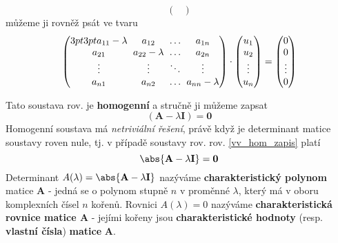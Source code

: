 \begin{definition}
\begin{equation}
\begin{pmatrix}
          \end{pmatrix}
        \end{equation}
        můžeme ji rovněž psát ve tvaru
        \begin{equation*}
            \begin{pmatrix}
            \setlength{\arraycolsep}{3pt}
              a_{11} -\lambda & a_{12}           & \ldots & a_{1n} \\
              a_{21}          & a_{22} -\lambda  & \ldots & a_{2n} \\
              \vdots          & \vdots           & \ddots & \vdots \\
              a_{n1}          & a_{n2}           & \ldots & a_{nn}-\lambda
            \end{pmatrix} \cdot
          \begin{pmatrix}
            u_{1} \\ u_{2} \\ \vdots \\ u_{n} \\
          \end{pmatrix}  =
          \begin{pmatrix}
              0 \\ 0 \\ \vdots \\ 0 \\
            \end{pmatrix}
        \end{equation*}
      \end{definition}

       Tato soustava rov. je \textbf{homogenní} a stručně ji můžeme zapsat
      \begin{equation}\label{vv_hom_zapis}
        \left(\mathbf{A} - \lambda\mathbf{I}\right) = \mathbf{0}
      \end{equation}
      Homogenní soustava má \emph{netriviální řešení}, právě když je determinant matice soustavy 
      roven  nule, tj. v případě soustavy rov. rov. \ref{vv_hom_zapis} platí
      \begin{equation}\label{vv_hom_reseni}
        \abs{\mathbf{A} - \lambda\mathbf{I}} = \mathbf{0}
      \end{equation}
      Determinant \(A(\lambda)=\abs{\mathbf{A} - \lambda \mathbf{I}}\) nazýváme 
      \textbf{charakteristický polynom} matice \(\mathbf{A}\) - jedná se o polynom stupně \(n\) v 
      proměnné \(\lambda\), který má v oboru komplexních čísel \(n\) kořenů. Rovnici 
      \(A(\lambda)=0\) nazýváme \textbf{charakteristická rovnice matice \(\mathbf{A}\)} - jejími 
      kořeny jsou \textbf{charakteristické hodnoty} (resp. \textbf{vlastní čísla}) 
      \textbf{matice} \(\mathbf{A}\).
            
